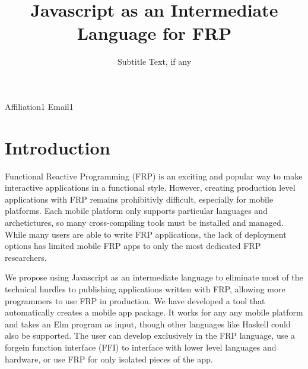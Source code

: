 \documentclass[preprint]{sigplanconf}
\begin{document}
\setlength{\pdfpageheight}{\paperheight}
\setlength{\pdfpagewidth}{\paperwidth}






\title{Javascript as an Intermediate Language for FRP}
\subtitle{Subtitle Text, if any}

           {Affiliation1}
           {Email1}

\maketitle

\section{Introduction}

Functional Reactive Programming (FRP) is an exciting and popular way to make interactive applications in a functional style.
However, creating production level applications with FRP remains prohibitivly difficult, especially for mobile platforms.
Each mobile platform only supports particular languages and archetictures, so many cross-compiling tools must be installed and managed.
While many users are able to write FRP applications, the lack of deployment options has limited mobile FRP apps to only the most dedicated FRP researchers.

We propose using Javascript as an intermediate language to eliminate most of the technical hurdles to publishing applications written with FRP, allowing more programmers to use FRP in production.
We have developed a tool that automatically creates a mobile app package.
It works for any any mobile platform and takes an Elm program as input, though other languages like Haskell could also be supported.
The user can develop exclusively in the FRP language, use a forgein function interface (FFI) to interface with lower level languages and hardware, or use FRP for only isolated pieces of the app.
\end{document}

